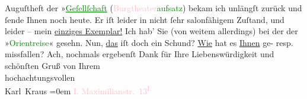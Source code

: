            \pstart
           Auguſtheft der »\textcolor{green}{\uline{Geſellſchaft}}{}\ledrightnote{\textcolor{green}{Die Gesellschaft. Monatsschrift}} (\textcolor{green}{\textcolor{pink}{Burgtheater}{}\ledrightnote{\textcolor{pink}{Burgtheater}}aufsatz}{}) bekam ich unlängſt zurück
               und ſende Ihnen noch heute. Er iſt leider in nicht ſehr salonfähigem Zuſtand, und
               leider – mein \uline{einziges Exemplar!}\pend
           \pstart
           {\pb}Ich hab’ Sie (von weitem allerdings) bei
               der \label{K_L00130_2v}\label{K_L00130_2h} der »\textcolor{green}{Orientreise}{}\ledrightnote{\textcolor{green}{Die Orientreise}}« gesehn. Nun, \uline{das} iſt doch ein Schund? \uline{Wie} hat es \uline{Ihnen} ge- resp. missfallen?\pend
           \pstart
           Ach, nochmals ergebenſt Dank für Ihre Liebenswürdigkeit und schönſten Gruß\pend
           \pstart
           von Ihrem{\\[\baselineskip]}hochachtungsvollen{\\[\baselineskip]}\spacefill\mbox{Karl Kraus}\pend
           \leftskip=0em{}\pstart
           \noindent{}\textcolor{pink}{I. Maximilianstr. 13\textsuperscript{I.}}{}\ledrightnote{\textcolor{pink}{Mahlerstraße}}\pend
           \endnumbering{}  
      